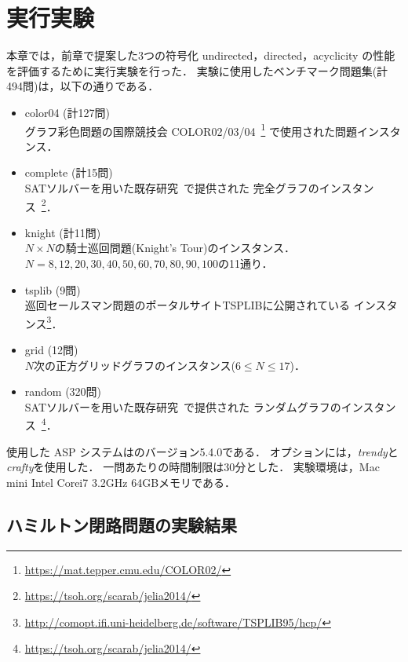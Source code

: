 \chapter{実行実験}\label{chap:experiment}

本章では，前章で提案した3つの符号化
\textsf{undirected}，\textsf{directed}，\textsf{acyclicity}
の性能を評価するために実行実験を行った．
%
実験に使用したベンチマーク問題集(計494問)は，以下の通りである．
\begin{itemize}
\item \textsf{color04} (計127問)\\
  グラフ彩色問題の国際競技会
  COLOR02/03/04~\footnote{\url{https://mat.tepper.cmu.edu/COLOR02/}}
  で使用された問題インスタンス．
\item \textsf{complete} (計15問)\\
  SATソルバーを用いた既存研究~\cite{soh14:jelia2014}で提供された
  完全グラフのインスタンス~\footnote{\url{https://tsoh.org/scarab/jelia2014/}}．
\item \textsf{knight} (計11問)\\
  $N\times N$の騎士巡回問題(Knight's Tour)のインスタンス．\\
  $N=8,12,20,30,40,50,60,70,80,90,100$の11通り．
\item \textsf{tsplib} (9問)\\
  巡回セールスマン問題のポータルサイトTSPLIBに公開されている
  インスタンス\footnote{\url{http://comopt.ifi.uni-heidelberg.de/software/TSPLIB95/hcp/}}．
\item \textsf{grid} (12問)\\
  $N$次の正方グリッドグラフのインスタンス($6\leq N\leq 17$)．
\item \textsf{random} (320問)\\
  SATソルバーを用いた既存研究~\cite{soh14:jelia2014}で提供された
  ランダムグラフのインスタンス~\footnote{\url{https://tsoh.org/scarab/jelia2014/}}．
\end{itemize}

使用した ASP システムは{\clingo}のバージョン5.4.0である．
オプションには，\textit{trendy}と\textit{crafty}を使用した．
一問あたりの時間制限は30分とした．
実験環境は，Mac mini Intel Corei7 3.2GHz 64GBメモリである．

\section{ハミルトン閉路問題の実験結果}

